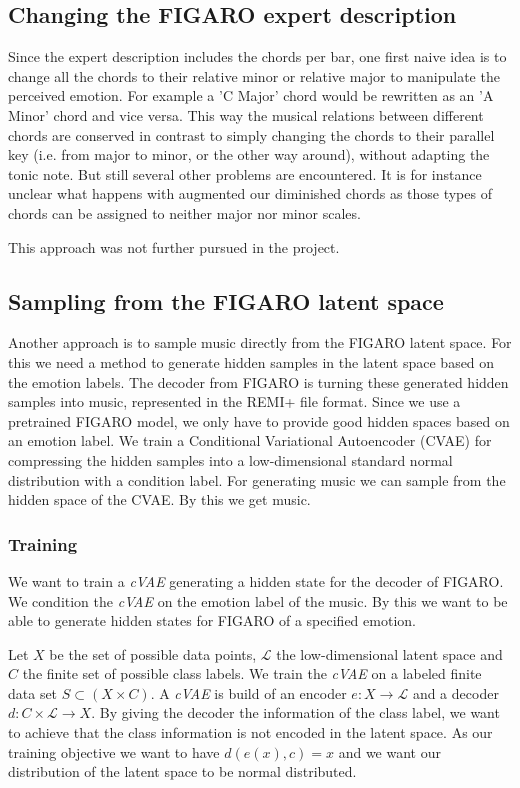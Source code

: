 \documentclass{article}
\begin{document}
\subsection{Changing the FIGARO expert description}
Since the expert description includes the chords per bar, one first naive idea is to change all the chords to their relative minor or relative major to manipulate the perceived emotion. For example a 'C Major' chord would be rewritten as an 'A Minor' chord and vice versa. This way the musical relations between different chords are conserved in contrast to simply changing the chords to their parallel key (i.e. from major to minor, or the other way around), without adapting the tonic note. But still several other problems are encountered. It is for instance unclear what happens with augmented our diminished chords as those types of chords can be assigned to neither major nor minor scales.

This approach was not further pursued in the project.

\subsection{Sampling from the FIGARO latent space}
Another approach is to sample music directly from the FIGARO latent space. For this we need a method to generate hidden samples in the latent space based on the emotion labels. The decoder from FIGARO is turning these generated hidden samples into music, represented in the REMI+ file format. Since we use a pretrained FIGARO model, we only have to provide good hidden spaces based on an emotion label. We train a Conditional Variational Autoencoder (CVAE) for compressing the hidden samples into a low-dimensional standard normal distribution with a condition label. For generating music we can sample from the hidden space of the CVAE. By this we get music.

\subsubsection{Training}
We want to train a \textit{cVAE} generating a hidden state for the decoder of FIGARO. We condition the \textit{cVAE} on the emotion label of the music. By this we want to be able to generate hidden states for FIGARO of a specified emotion.

Let $X$ be the set of possible data points, $\mathscr{L}$ the low-dimensional latent space and $C$ the finite set of possible class labels. We train the \textit{cVAE} on a labeled finite data set $S \subset (X \times C)$. A \textit{cVAE} is build of an encoder $e: X \rightarrow \mathscr L$ and a decoder $d: C \times \mathscr L \rightarrow X$. By giving the decoder the information of the class label, we want to achieve that the class information is not encoded in the latent space. As our training objective we want to have $d(e(x), c) = x$ and we want our distribution of the latent space to be normal distributed.
\end{document}
